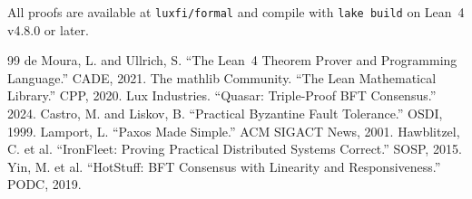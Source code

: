\documentclass[11pt,a4paper]{article}
\begin{document}
All proofs are available at \texttt{luxfi/formal} and compile with \texttt{lake build}
on Lean~4 v4.8.0 or later.

\begin{thebibliography}{99}
 de Moura, L. and Ullrich, S. ``The Lean~4 Theorem Prover and Programming Language.'' CADE, 2021.
 The mathlib Community. ``The Lean Mathematical Library.'' CPP, 2020.
 Lux Industries. ``Quasar: Triple-Proof BFT Consensus.'' 2024.
 Castro, M. and Liskov, B. ``Practical Byzantine Fault Tolerance.'' OSDI, 1999.
 Lamport, L. ``Paxos Made Simple.'' ACM SIGACT News, 2001.
 Hawblitzel, C. et al. ``IronFleet: Proving Practical Distributed Systems Correct.'' SOSP, 2015.
 Yin, M. et al. ``HotStuff: BFT Consensus with Linearity and Responsiveness.'' PODC, 2019.
\end{thebibliography}
\end{document}
